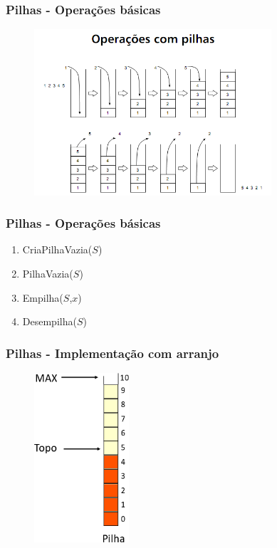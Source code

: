 \documentclass[aspectratio=169]{beamer}
\begin{document}

\begin{frame}
\frametitle{Pilhas - Operações básicas}
\begin{figure}[!h]
  \centering
  \includegraphics[width=250pt]{imgs/operacoes_pilhas.png}
  \label{fig_operacoes_pilhas}
\end{figure}
\end{frame}


\begin{frame}
\frametitle{Pilhas - Operações básicas}
\begin{enumerate}
 \item CriaPilhaVazia($S$) 
 \item PilhaVazia($S$)
 \item Empilha($S$,$x$)
 \item Desempilha($S$) 
\end{enumerate}
\end{frame}


\begin{frame}
\frametitle{Pilhas - Implementação com arranjo}
\begin{figure}[!h]
  \centering
  \includegraphics[width=100pt]{imgs/pilha_implementacao.png}
  \label{fig_pilha_implementacao}
\end{figure}
\end{frame}
\end{document}
